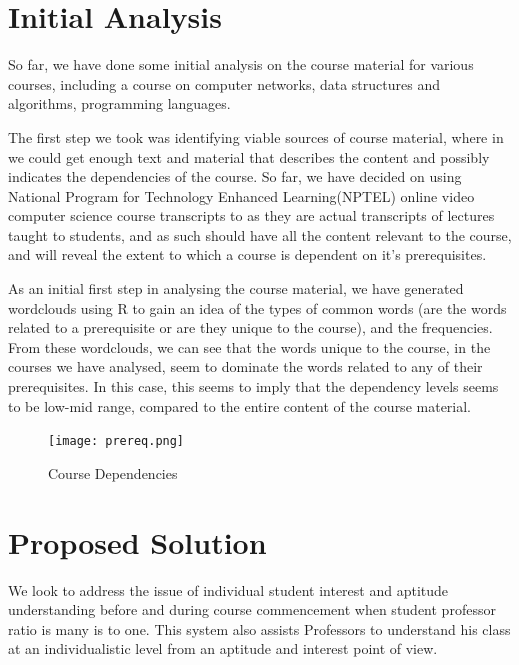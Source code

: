 \documentclass[conference]{IEEEtran}
\begin{document}
	\section{Initial Analysis}
So far, we have done some initial analysis on the course material for various courses, including a course on computer networks, data structures and algorithms, programming languages.

The first step we took was identifying viable sources of course material, where in we could get enough text and material that describes the content and possibly indicates the dependencies of the course. So far, we have decided on using National Program for Technology Enhanced Learning(NPTEL)\cite{nptel} online video computer science course transcripts to as they are actual transcripts of lectures taught to students, and as such should have all the content relevant to the course, and will reveal the extent to which a course is dependent on it's prerequisites.

As an initial first step in analysing the course material, we have generated wordclouds using R\cite{r} to gain an idea of the types of common words (are the words related to a prerequisite or are they unique to the course), and the frequencies. From these wordclouds, we can see that the words unique to the course, in the courses we have analysed, seem to dominate the words related to any of their prerequisites. In this case, this seems to imply that the dependency levels seems to be low-mid range, compared to the entire content of the course material.

\begin{figure}
	\texttt{[image: prereq.png]}
	\caption{Course Dependencies}
	\label{fig:prereq}
\end{figure}
	\section{Proposed Solution}
We look to address the issue of individual student interest and aptitude understanding before and during course commencement when student professor ratio is many is to one. This system also assists Professors to understand his class at an individualistic level from an aptitude and interest point of view.
\end{document}
